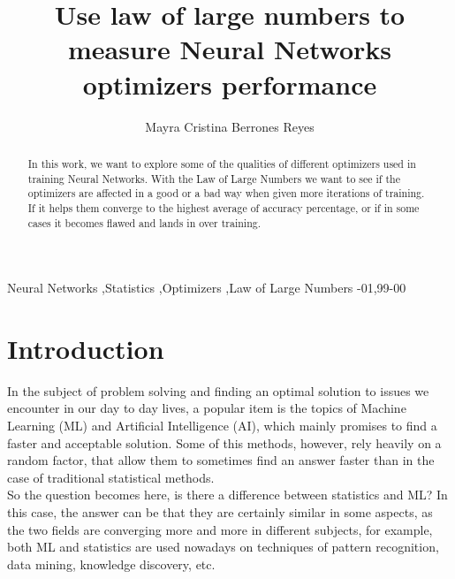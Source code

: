 \documentclass[review]{elsarticle}
\begin{document}
\begin{frontmatter}

\title{Use law of large numbers to measure Neural Networks optimizers performance}

\author{Mayra Cristina Berrones Reyes}
\address{Universidad Aut\'onoma de Nuevo Le\'on. Facultad de Ingenier\'ia Mec\'anica y El\'ectrica}


\begin{abstract}
In this work, we want to explore some of the qualities of different optimizers used in training Neural Networks. With the Law of Large Numbers we want to see if the optimizers are affected in a good or a bad way when given more iterations of training. If it helps them converge to the highest average of accuracy percentage, or if in some cases it becomes flawed and lands in over training. 

\end{abstract}

\begin{keyword}
Neural Networks \sep Statistics \sep Optimizers \sep Law of Large Numbers 
-01\sep  99-00
\end{keyword}

\end{frontmatter}

\linenumbers

\section{Introduction}\label{introduction}

In the subject of problem solving and finding an optimal solution to issues we encounter in our day to day lives, a popular item is the topics of Machine Learning (ML) and Artificial Intelligence (AI), which mainly promises to find a faster and acceptable solution. Some of this methods, however, rely heavily on a random factor, that allow them to sometimes find an answer faster than in the case of traditional statistical methods.\\

So the question becomes here, is there a difference between statistics and ML? In this case, the answer can be that they are certainly similar in some aspects, as the two fields are converging more and more in different subjects, for example, both ML and statistics are used nowadays on techniques of pattern recognition, data mining, knowledge discovery, etc. \\
\end{document}
